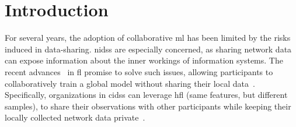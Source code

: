 

\section{Introduction}\label{sec:intro}

%

For several years, the adoption of collaborative \gls{ml} has been limited by the risks induced in data-sharing.
\Glspl{nids} are especially concerned, as sharing network data can expose information about the inner workings of information systems.
The recent advances~\cite{kairouz_advances_2021} in \gls{fl} promise to solve such issues, allowing participants to collaboratively train a global model without sharing their local data~\cite{mcmahan_communication-efficient_2017}.
Specifically, organizations in \glspl{cids} can leverage \gls{hfl} (\ie same features, but different samples), to share their observations with other participants while keeping their locally collected network data private~\cite{lavaur_evolution_2022}. %

